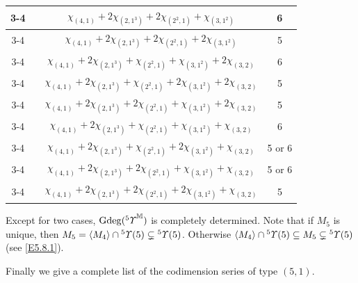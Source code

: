 \documentclass{amsart}
\theoremstyle{definition}
\theoremstyle{remark}
\numberwithin{equation}{section}
\def\gd{\operatorname{Gdeg}}
\newcommand{\lr}[1]{\langle #1 \rangle}
\newcommand{\up}[1]{{^{#1}{\it \!\Upsilon}}}
\newcommand{\upa}[1]{{^{#1}{\it \!\Upsilon}}}
\begin{document}
\begin{center}
\begin{tabular}{|c|c|c|c|}
		\cline{3-4}
		&                                    & $\chi_{(4,1)}+2\chi_{(2,1^3)}+2\chi_{(2^2,1)}+\chi_{(3,1^2)}$               & 6       \\
		\cline{3-4}
		&                                    & $\chi_{(4,1)}+2\chi_{(2,1^3)}+2\chi_{(2^2,1)}+2\chi_{(3,1^2)}$                & 5       \\ 									
		\cline{3-4}
		&                                    & $\chi_{(4,1)}+2\chi_{(2,1^3)}+\chi_{(2^2,1)}+\chi_{(3,1^2)}+2\chi_{(3,2)}$  & 6       \\
		\cline{3-4}
		&                                    & $\chi_{(4,1)}+2\chi_{(2,1^3)}+\chi_{(2^2,1)}+2\chi_{(3,1^2)}+2\chi_{(3,2)}$ & 5       \\
		\cline{3-4}
		&                                    & $\chi_{(4,1)}+2\chi_{(2,1^3)}+2\chi_{(2^2,1)}+\chi_{(3,1^2)}+2\chi_{(3,2)}$ & 5       \\									
		\cline{3-4}
		&                                    & $\chi_{(4,1)}+2\chi_{(2,1^3)}+\chi_{(2^2,1)}+\chi_{(3,1^2)}+\chi_{(3,2)}$   & 6       \\
		\cline{3-4}
		&                                    & $\chi_{(4,1)}+2\chi_{(2,1^3)}+\chi_{(2^2,1)}+2\chi_{(3,1^2)}+\chi_{(3,2)}$  & 5 or 6  \\
		\cline{3-4}
		&                                    & $\chi_{(4,1)}+2\chi_{(2,1^3)}+2\chi_{(2^2,1)}+\chi_{(3,1^2)}+\chi_{(3,2)}$  & 5 or 6  \\
		\cline{3-4}
		&                                    & $\chi_{(4,1)}+2\chi_{(2,1^3)}+2\chi_{(2^2,1)}+2\chi_{(3,1^2)}+\chi_{(3,2)}$   & 5       \\ \hline
	\end{tabular}	
\end{center}

Except for two cases, $\gd(\upa{5}^{\mathbb M})$ is 
completely determined. Note that if $M_5$ is unique, then 
$M_5=\lr{M_4}\cap \up{5}(5)\subsetneq \up{5}(5)$. Otherwise 
$\lr{M_4}\cap \up{5}(5)\subseteq M_5\subsetneq \up{5}(5)$
(see \eqref{E5.8.1}).


Finally we give a complete list of the codimension series 
of type $(5, 1)$. 
	
\end{document}
